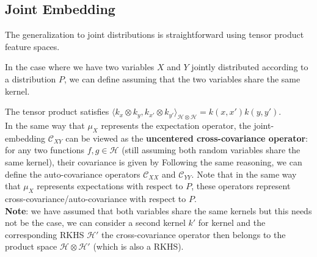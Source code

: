 \subsection{Joint Embedding}
The generalization to joint distributions is straightforward using tensor product feature spaces.
\begin{ybox}
In the case where we have two variables $X$ and $Y$ jointly distributed according to a distribution $P$, we can define
assuming that the two variables share the same kernel.
\end{ybox}
The tensor product satisfies $\langle k_{x}\otimes  k_{y}, k_{x'} \otimes k_{y'} \rangle_{\mathcal H\otimes \mathcal H} = k(x,x')k(y,y')$.\\

In the same way that $\mu_{X}$ represents the expectation operator, the joint-embedding $\mathcal C_{XY}$ can be viewed as the \textbf{uncentered cross-covariance operator}: for any two functions $f,g\in \mathcal H$ (still assuming both random variables share the same kernel), their covariance is given by
Following the same reasoning, we can define the auto-covariance operators $\mathcal C_{XX}$ and $\mathcal C_{YY}$. Note that in the same way that $\mu_X$ represents expectations with respect to $P$, these operators represent cross-covariance/auto-covariance with respect to $P$.\\
\textbf{Note}: we have assumed that both variables share the same kernels but this needs not be the case, we can consider a second kernel $k'$ for kernel and the corresponding RKHS $\mathcal H'$ the cross-covariance operator then belongs to the product space $\mathcal H\otimes\mathcal H'$ (which is also a RKHS).

